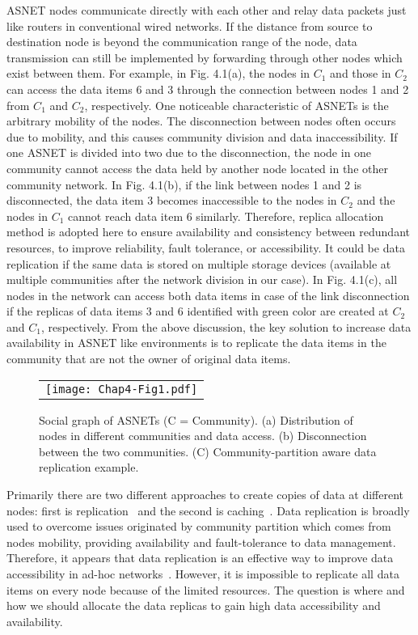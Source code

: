 ASNET nodes communicate directly with each other and relay data packets just like routers in conventional wired networks. If the distance from source to destination node is beyond the communication range of the node, data transmission can still be implemented by forwarding through other nodes which exist between them. For example, in Fig. 4.1(a), the nodes in $C_1$ and those in $C_2$ can access the data items 6 and 3 through the connection between nodes 1 and 2 from $C_1$ and $C_2$, respectively. One noticeable characteristic of ASNETs is the arbitrary mobility of the nodes. The disconnection between nodes often occurs due to mobility, and this causes community division and data inaccessibility. If one ASNET is divided into two due to the disconnection, the node in one community cannot access the data held by another node located in the other community network. In Fig. 4.1(b), if the link between nodes 1 and 2 is disconnected, the data item 3 becomes inaccessible to the nodes in $C_2$ and the nodes in $C_1$ cannot reach data item 6 similarly. Therefore, replica allocation method is adopted here to ensure availability and consistency between redundant resources, to improve reliability, fault tolerance, or accessibility. It could be data replication if the same data is stored on multiple storage devices (available at multiple communities after the network division in our case). In Fig. 4.1(c), all nodes in the network can access both data items in case of the link disconnection if the replicas of data items 3 and 6 identified with green color are created at $C_2$ and $C_1$, respectively. From the above discussion, the key solution to increase data availability in ASNET like environments is to replicate the data items in the community that are not the owner of original data items.

\begin{figure}[h]\label{fig:Chap4-Fig1}
\begin{center}
  \begin{tabular}{c}
  \texttt{[image: Chap4-Fig1.pdf]}
  \end{tabular}
  \caption{Social graph of ASNETs (C = Community). (a) Distribution of nodes in different communities and data access. (b) Disconnection between the two communities. (C) Community-partition aware data replication example.}
\end{center}
\end{figure}


Primarily there are two different approaches to create copies of data at different nodes: first is replication~\cite{ADerhab2009} and the second is caching~\cite{GXylomenos2012}. Data replication is broadly used to overcome issues originated by community partition which comes from nodes mobility, providing availability and fault-tolerance to data management. Therefore, it appears that data replication is an effective way to improve data accessibility in ad-hoc networks~\cite{WLu2010}\cite{GCao2004}\cite{LDFife2004}. However, it is impossible to replicate all data items on every node because of the limited resources. The question is where and how we should allocate the data replicas to gain high data accessibility and availability.

